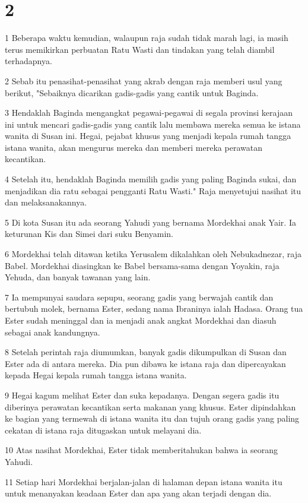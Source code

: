 \chapter{2}

\par 1 Beberapa waktu kemudian, walaupun raja sudah tidak marah lagi, ia masih terus memikirkan perbuatan Ratu Wasti dan tindakan yang telah diambil terhadapnya.
\par 2 Sebab itu penasihat-penasihat yang akrab dengan raja memberi usul yang berikut, "Sebaiknya dicarikan gadis-gadis yang cantik untuk Baginda.
\par 3 Hendaklah Baginda mengangkat pegawai-pegawai di segala provinsi kerajaan ini untuk mencari gadis-gadis yang cantik lalu membawa mereka semua ke istana wanita di Susan ini. Hegai, pejabat khusus yang menjadi kepala rumah tangga istana wanita, akan mengurus mereka dan memberi mereka perawatan kecantikan.
\par 4 Setelah itu, hendaklah Baginda memilih gadis yang paling Baginda sukai, dan menjadikan dia ratu sebagai pengganti Ratu Wasti." Raja menyetujui nasihat itu dan melaksanakannya.
\par 5 Di kota Susan itu ada seorang Yahudi yang bernama Mordekhai anak Yair. Ia keturunan Kis dan Simei dari suku Benyamin.
\par 6 Mordekhai telah ditawan ketika Yerusalem dikalahkan oleh Nebukadnezar, raja Babel. Mordekhai diasingkan ke Babel bersama-sama dengan Yoyakin, raja Yehuda, dan banyak tawanan yang lain.
\par 7 Ia mempunyai saudara sepupu, seorang gadis yang berwajah cantik dan bertubuh molek, bernama Ester, sedang nama Ibraninya ialah Hadasa. Orang tua Ester sudah meninggal dan ia menjadi anak angkat Mordekhai dan diasuh sebagai anak kandungnya.
\par 8 Setelah perintah raja diumumkan, banyak gadis dikumpulkan di Susan dan Ester ada di antara mereka. Dia pun dibawa ke istana raja dan dipercayakan kepada Hegai kepala rumah tangga istana wanita.
\par 9 Hegai kagum melihat Ester dan suka kepadanya. Dengan segera gadis itu diberinya perawatan kecantikan serta makanan yang khusus. Ester dipindahkan ke bagian yang termewah di istana wanita itu dan tujuh orang gadis yang paling cekatan di istana raja ditugaskan untuk melayani dia.
\par 10 Atas nasihat Mordekhai, Ester tidak memberitahukan bahwa ia seorang Yahudi.
\par 11 Setiap hari Mordekhai berjalan-jalan di halaman depan istana wanita itu untuk menanyakan keadaan Ester dan apa yang akan terjadi dengan dia.
